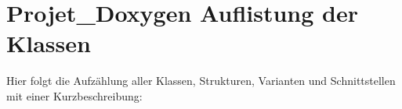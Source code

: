 \section{Projet\_\-Doxygen Auflistung der Klassen}
Hier folgt die Aufz\"{a}hlung aller Klassen, Strukturen, Varianten und Schnittstellen mit einer Kurzbeschreibung:\begin{CompactList}
\item{}
\end{CompactList}
